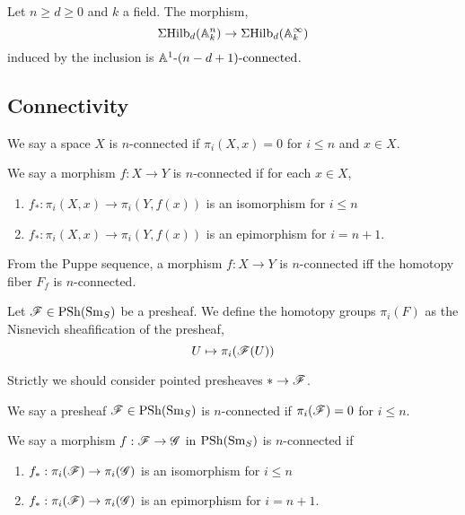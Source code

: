 \documentclass[12pt]{article}
\begin{document}
\begin{theorem}
Let $n \ge d \ge 0$ and $k$ a field. The morphism,
\[ \Sigma \mathrm{Hilb}_d(\mathbb{A}^n_k) \to \Sigma \mathrm{Hilb}_d(\mathbb{A}^\infty_k) \]
induced by the inclusion is $\mathbb{A}^1\text{-}(n-d+1)\text{-connected}$.
\end{theorem}

\subsection{Connectivity}

\begin{defn}
We say a space $X$ is $n$-connected if $\pi_i(X, x) = 0$ for $i \le n$ and $x \in X$.
\end{defn}

\begin{defn}
We say a morphism $f : X \to Y$ is $n$-connected if for each $x \in X$,
\begin{enumerate}
\item $f_* : \pi_i(X, x) \to \pi_i(Y, f(x))$ is an isomorphism for $i \le n$
\item $f_* : \pi_i(X, x) \to \pi_i(Y, f(x))$ is an epimorphism for $i = n+1$.
\end{enumerate}
\end{defn}

\begin{rmk}
From the Puppe sequence, a morphism $f : X \to Y$ is $n$-connected iff the homotopy fiber $F_f$ is $n$-connected. 
\end{rmk}

\begin{defn}
Let $\mathscr{F} \in \mathrm{PSh}(\mathrm{Sm}_S)$ be a presheaf. We define the homotopy groups $\pi_i(F)$ as the Nisnevich sheafification of the presheaf,
\[ U \mapsto \pi_i(\mathscr{F}(U)) \]
\end{defn}

\begin{rmk}
Strictly we should consider pointed presheaves $* \to \mathscr{F}$.
\end{rmk}

\begin{defn}
We say a presheaf $\mathscr{F} \in \mathrm{PSh}(\mathrm{Sm}_S)$ is $n$-connected if $\pi_i(\mathscr{F}) = 0$ for $i \le n$.
\end{defn}

\begin{defn}
We say a morphism $f : \mathscr{F} \to \mathscr{G}$ in $\mathrm{PSh}(\mathrm{Sm}_S)$ is $n$-connected if
\begin{enumerate}
\item $f_* : \pi_i(\mathscr{F}) \to \pi_i(\mathscr{G})$ is an isomorphism for $i \le n$
\item $f_* : \pi_i(\mathscr{F}) \to \pi_i(\mathscr{G})$ is an epimorphism for $i = n+1$.
\end{enumerate} 
\end{defn}
\end{document}
